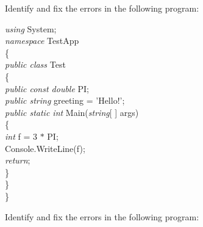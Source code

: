 {\begin{list}{E \thechapter.\theenumi}

\item Identify and fix the errors in the following program:


\emph{using} System; \\
\emph{namespace} TestApp \\
\{\\
\hspace*{0.2in}    \emph{public class} Test\\
\hspace*{0.2in}    \{\\
\hspace*{0.4in}        \emph{public const double} PI;\\
\hspace*{0.4in}        \emph{public string} greeting = 'Hello!';\\
\hspace*{0.4in}        \emph{public static int}  Main(\emph{string}[ ] args)\\
\hspace*{0.4in}        \{\\
\hspace*{0.6in}            \emph{int} f = 3 $\ast$ PI;\\
\hspace*{0.6in}            Console.WriteLine(f);\\
\hspace*{0.6in}            \emph{return};\\
\hspace*{0.4in}        \}\\
\hspace*{0.2in}  \}\\
\}



\item Identify and fix the errors in the following program:


\end{list}}
